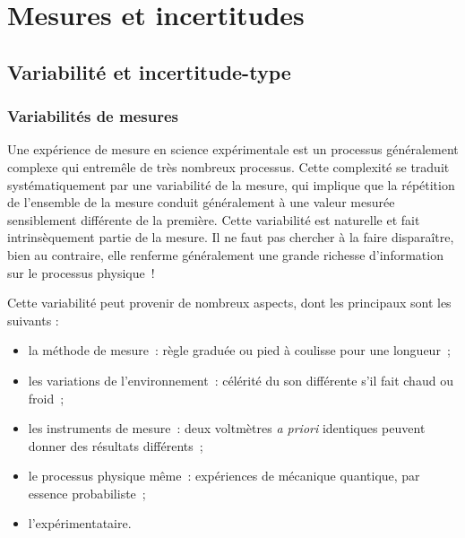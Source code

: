 \documentclass[../main/main.tex]{subfiles}
\begin{document}
\setcounter{chapter}{-1}

\chapter{Mesures et incertitudes}


\section{Variabilité et incertitude-type}
\subsection{Variabilités de mesures}
Une expérience de mesure en science expérimentale est un processus généralement
complexe qui entremêle de très nombreux processus. Cette complexité se traduit
systématiquement par une variabilité de la mesure, qui implique que la
répétition de l'ensemble de la mesure conduit généralement à une valeur mesurée
sensiblement différente de la première. Cette variabilité est naturelle et fait
intrinsèquement partie de la mesure. Il ne faut pas chercher à la faire
disparaître, bien au contraire, elle renferme généralement une grande richesse
d'information sur le processus physique~!

Cette variabilité peut provenir de nombreux aspects, dont les principaux sont
les suivants :
\begin{itemize}[label=$\diamond$, leftmargin=10pt]
  \item la méthode de mesure~: règle graduée ou pied à coulisse pour une
    longueur~;
  \item les variations de l'environnement~: célérité du son différente s'il fait
    chaud ou froid~;
  \item les instruments de mesure~: deux voltmètres \textit{a priori} identiques
    peuvent donner des résultats différents~;
  \item le processus physique même~: expériences de mécanique quantique, par
    essence probabiliste~;
  \item l'expérimentataire.
\end{itemize}
\end{document}

